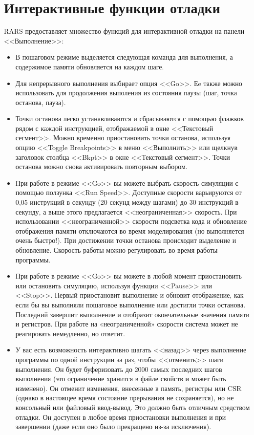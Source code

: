 \section{Интерактивные функции отладки}

RARS предоставляет множество функций для интерактивной отладки на панели <<Выполнение>>:
\begin{itemize}
    \item В пошаговом режиме выделяется следующая команда для выполнения, а содержимое памяти обновляется на каждом шаге.
    \item Для непрерывного выполнения выбирает опция <<Go>>. Еe также можно использовать для продолжения выполения из состояния паузы (шаг, точка останова, пауза).
    \item Точки останова легко устанавливаются и сбрасываются с помощью флажков рядом с каждой инструкцией, отображаемой в окне <<Текстовый сегмент>>. Можно временно приостановить точки останова, используя опцию <<Toggle Breakpoints>> в меню <<Выполнить>> или щелкнув заголовок столбца <<Bkpt>> в окне <<Текстовый сегмент>>. Точки останова можно снова активировать повторным выбором.
    \item При работе в режиме <<Go>> вы можете выбрать скорость симуляции с помощью ползунка <<Run Speed>>. Доступные скорости варьируются от 0,05 инструкций в секунду (20 секунд между шагами) до 30 инструкций в секунду, а выше этого предлагается <<неограниченная>> скорость. При использовании <<неограниченной>> скорости подсветка кода и обновление отображения памяти отключаются во время моделирования (но выполняется очень быстро!). При достижении точки останова происходит выделение и обновление. Скорость работы можно регулировать во время работы программы.
    \item При работе в режиме <<Go>> вы можете в любой момент приостановить или остановить симуляцию, используя функции <<Pause>> или <<Stop>>. Первый приостановит выполнение и обновит отображение, как если бы вы выполняли пошаговое выполнение или достигли точки останова. Последний завершит выполнение и отобразит окончательные значения памяти и регистров. При работе на «неограниченной» скорости система может не реагировать немедленно, но ответит.
    \item У вас есть возможность интерактивно шагать <<назад>> через выполнение программы по одной инструкции за раз, чтобы <<отменить>> шаги выполнения. Он будет буферизовать до 2000 самых последних шагов выполнения (это ограничение хранится в файле свойств и может быть изменено). Он отменит изменения, внесенные в память, регистры или CSR (однако в настоящее время состояние прерывания не сохраняется), но не консольный или файловый ввод-вывод. Это должно быть отличным средством отладки. Он доступен в любое время приостановки выполнения и при завершении (даже если оно было прекращено из-за исключения).

\end{itemize}
